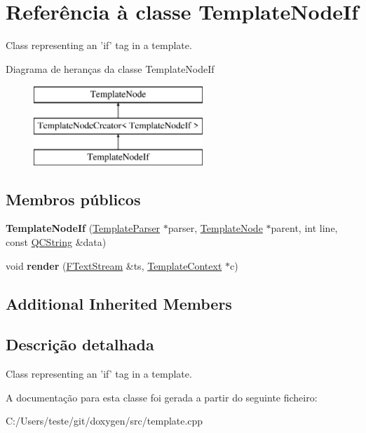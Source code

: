 \hypertarget{class_template_node_if}{\section{Referência à classe Template\-Node\-If}
\label{class_template_node_if}
}


Class representing an 'if' tag in a template.  


Diagrama de heranças da classe Template\-Node\-If\begin{figure}[H]
\begin{center}
\leavevmode
\includegraphics[height=3.000000cm]{class_template_node_if}
\end{center}
\end{figure}
\subsection*{Membros públicos}
\begin{DoxyCompactItemize}
\item 
\hypertarget{class_template_node_if_aad7e5bb05b233726beed8391889257ef}{{\bfseries Template\-Node\-If} (\hyperlink{class_template_parser}{Template\-Parser} $\ast$parser, \hyperlink{class_template_node}{Template\-Node} $\ast$parent, int line, const \hyperlink{class_q_c_string}{Q\-C\-String} \&data)}\label{class_template_node_if_aad7e5bb05b233726beed8391889257ef}

\item 
\hypertarget{class_template_node_if_aaa6575d8c79eeaa49f849f1ca1d6b228}{void {\bfseries render} (\hyperlink{class_f_text_stream}{F\-Text\-Stream} \&ts, \hyperlink{class_template_context}{Template\-Context} $\ast$c)}\label{class_template_node_if_aaa6575d8c79eeaa49f849f1ca1d6b228}

\end{DoxyCompactItemize}
\subsection*{Additional Inherited Members}


\subsection{Descrição detalhada}
Class representing an 'if' tag in a template. 

A documentação para esta classe foi gerada a partir do seguinte ficheiro\-:\begin{DoxyCompactItemize}
\item 
C\-:/\-Users/teste/git/doxygen/src/template.\-cpp\end{DoxyCompactItemize}

